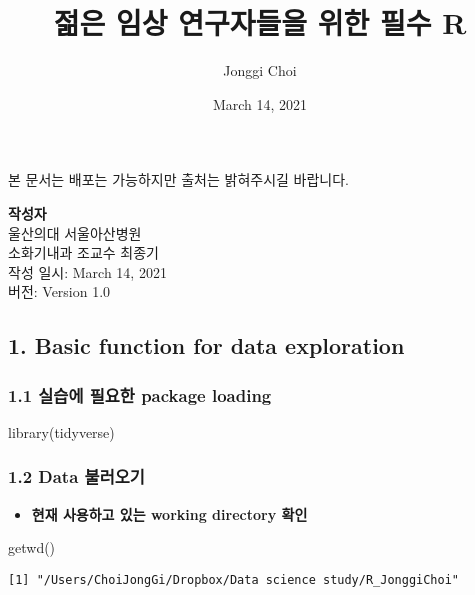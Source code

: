 \documentclass[
]{article}
\title{젊은 임상 연구자들을 위한 필수 R}
\author{Jonggi Choi}
\date{March 14, 2021}
\newenvironment{Shaded}{\begin{snugshade}}{\end{snugshade}}
\newcommand{\FunctionTok}[1]{\textcolor[rgb]{0.00,0.00,0.00}{#1}}
\newcommand{\NormalTok}[1]{#1}
\providecommand{\tightlist}{%
  \setlength{\itemsep}{0pt}\setlength{\parskip}{0pt}}
\begin{document}
\maketitle

본 문서는 배포는 가능하지만 출처는 밝혀주시길 바랍니다.

\textbf{작성자}\\
울산의대 서울아산병원\\
소화기내과 조교수 최종기\\
작성 일시: March 14, 2021\\
버전: Version 1.0

\hypertarget{basic-function-for-data-exploration}{%
\subsection{1. Basic function for data
exploration}\label{basic-function-for-data-exploration}}

\hypertarget{uxc2e4uxc2b5uxc5d0-uxd544uxc694uxd55c-package-loading}{%
\subsubsection{1.1 실습에 필요한 package
loading}\label{uxc2e4uxc2b5uxc5d0-uxd544uxc694uxd55c-package-loading}}

\begin{Shaded}
\begin{Highlighting}[]
\FunctionTok{library}\NormalTok{(tidyverse)}
\end{Highlighting}
\end{Shaded}

\hypertarget{data-uxbd88uxb7ecuxc624uxae30}{%
\subsubsection{1.2 Data 불러오기}\label{data-uxbd88uxb7ecuxc624uxae30}}

\begin{itemize}
\tightlist
\item
  \textbf{현재 사용하고 있는 working directory 확인}
\end{itemize}

\begin{Shaded}
\begin{Highlighting}[]
\FunctionTok{getwd}\NormalTok{()}
\end{Highlighting}
\end{Shaded}

\begin{verbatim}
[1] "/Users/ChoiJongGi/Dropbox/Data science study/R_JonggiChoi"
\end{verbatim}
\end{document}
